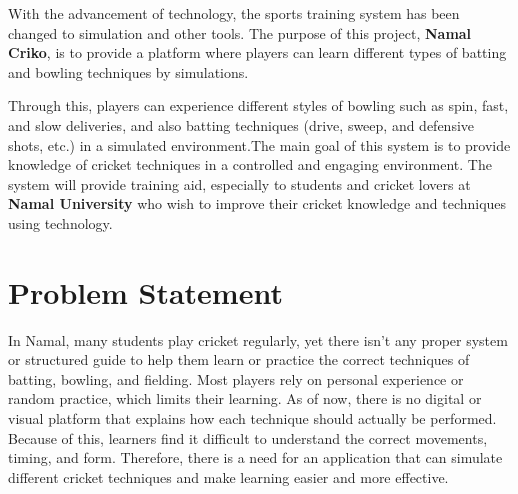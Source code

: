 \documentclass[12pt,a4paper]{article}
\begin{document}
With the advancement of technology, the sports training system has been changed to simulation and other tools. The purpose of this project, \textbf{Namal Criko}, is to provide a platform where players can learn different types of batting and bowling techniques by simulations.


Through this, players can experience different styles of bowling such as spin, fast, and slow deliveries, and also batting techniques (drive, sweep, and defensive shots, etc.) in a simulated environment.The main goal of this system is to provide knowledge of cricket techniques in a controlled and engaging environment. The system will provide training aid, especially to students and cricket lovers at \textbf{Namal University} who wish to improve their cricket knowledge and techniques using technology.

\section{Problem Statement}
In Namal, many students play cricket regularly, yet there isn’t any proper system or structured guide to help them learn or practice the correct techniques of batting, bowling, and fielding. Most players rely on personal experience or random practice, which limits their learning. As of now, there is no digital or visual platform that explains how each technique should actually be performed. Because of this, learners find it difficult to understand the correct movements, timing, and form. Therefore, there is a need for an application that can simulate different cricket techniques and make learning easier and more effective.

\end{document}
